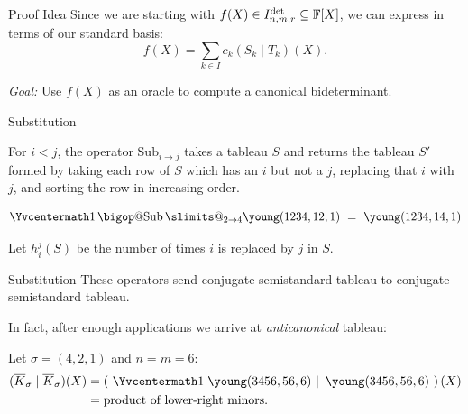 \documentclass[aspectratio=169]{beamer}
\makeatletter
\DeclareRobustCommand\bigop[1]{%
  \mathop{\vphantom{\cdot}\mathpalette\bigop@{#1}}\slimits@
}
\newcommand{\bigop@}[2]{%
  \vcenter{%
    \sbox\z@{$#1\sum$}%
    \hbox{\resizebox{\ifx#1\displaystyle.9\fi\dimexpr\ht\z@+\dp\z@}{!}{$\m@th#2$}}%
  }%
}
\newcommand{\Sub}{\DOTSB\bigop{\mathrm{Sub}}}
\makeatother
\begin{document}

\begin{frame}{Proof Idea}
  Since we are starting with $f(X) \in I^{\det}_{n, m, r} \subseteq \mathbb{F}[X]$\pause, we can express in terms of our standard basis:
  \[
    f(X) = \sum_{k \in I} c_k (S_k \mid T_k)(X).
  \]

  \pause
  \vspace{20pt}

  \emph{Goal:} Use $f(X)$ as an oracle to compute a canonical bideterminant.
\end{frame}
  
\begin{frame}{Substitution}
    \begin{defn}
        For $i < j$, the operator $\mathrm{Sub}_{i \to j}$ takes a tableau $S$ and returns the tableau $S'$ formed by taking each row of $S$ which has an $i$ but not a $j$, replacing that $i$ with $j$, and sorting the row in increasing order.

        \pause
        
        \[
            \Yvcentermath1 \Sub_{2 \to 4} \young(1234,12,1)\ =\ \young(1234,14,1)
        \]

        \pause
        
        Let $h_{i}^{j}(S)$ be the number of times $i$ is replaced by $j$ in $S$.
    \end{defn}
\end{frame}

\begin{frame}{Substitution}
  These operators send conjugate semistandard tableau to conjugate semistandard tableau.

  \pause

  In fact, after enough applications we arrive at \emph{anticanonical} tableau:
  \pause

  Let $\sigma = (4, 2, 1)$ and $n = m = 6$:
  \begin{align*}
    (\overline{K}_\sigma \mid \overline{K}_\sigma)(X) &= \left(\ \Yvcentermath1 \left. \young(3456,56,6)\ \right\vert\ \young(3456,56,6) \ \right)(X) \\
                                                      &= \text{product of lower-right minors}.
  \end{align*}
\end{frame}
\end{document}
